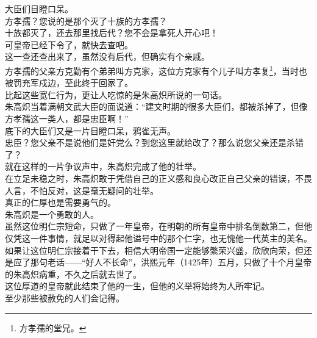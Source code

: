 \begin{multicols}{\theparacolNo}
大臣们目瞪口呆。\\

方孝孺？您说的是那个灭了十族的方孝孺？\\

十族都灭了，还去那里找后代？您不会是拿死人开心吧！\\

可皇帝已经下令了，就快去查吧。\\

这一查还查出来了，虽然没有后代，但确实有个亲戚。\\

方孝孺的父亲方克勤有个弟弟叫方克家，这位方克家有个儿子叫方孝复\footnote{方孝孺的堂兄。}，当时也被罚充军戍边，至此终于回家了。\\

比起这些宽仁行为，更让人吃惊的是朱高炽所说的一句话。\\

朱高炽当着满朝文武大臣的面说道：“建文时期的很多大臣们，都被杀掉了，但像方孝孺这一类人，都是忠臣啊！”\\

底下的大臣们又是一片目瞪口呆，鸦雀无声。\\

忠臣？您父亲不是说他们是奸党么？到您这里就给改了？那么说您父亲还是杀错了？\\

就在这样的一片争议声中，朱高炽完成了他的壮举。\\

在立足未稳之时，朱高炽敢于凭借自己的正义感和良心改正自己父亲的错误，不畏人言，不怕反对，这是毫无疑问的壮举。\\

真正的仁厚也是需要勇气的。\\

朱高炽是一个勇敢的人。\\

虽然这位明仁宗短命，只做了一年皇帝，在明朝的所有皇帝中排名倒数第二，但他仅凭这一件事情，就足以对得起他谥号中的那个仁字，也无愧他一代英主的美名。\\

如果让这位明仁宗接着干下去，相信大明帝国一定能够繁荣兴盛，欣欣向荣，但还是应了那句老话——“好人不长命”，洪熙元年（1425年）五月，只做了十个月皇帝的朱高炽病重，不久之后就去世了。\\

这位厚道的皇帝就此结束了他的一生，但他的义举将始终为人所牢记。\\

至少那些被赦免的人们会记得。\\


\end{multicols}
